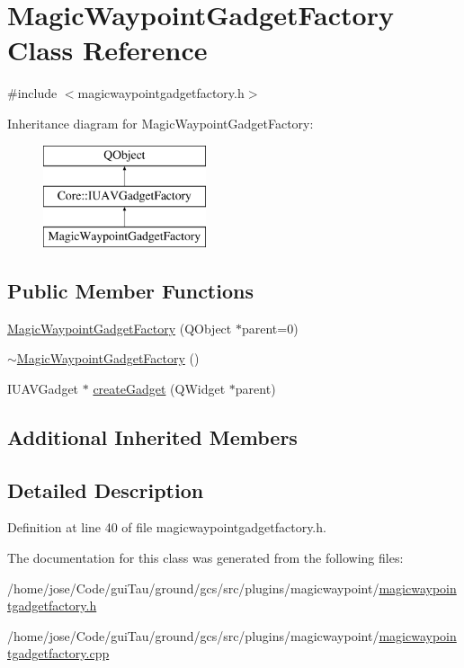 \hypertarget{class_magic_waypoint_gadget_factory}{\section{Magic\-Waypoint\-Gadget\-Factory Class Reference}
\label{class_magic_waypoint_gadget_factory}
}


{\ttfamily \#include $<$magicwaypointgadgetfactory.\-h$>$}

Inheritance diagram for Magic\-Waypoint\-Gadget\-Factory\-:\begin{figure}[H]
\begin{center}
\leavevmode
\includegraphics[height=3.000000cm]{class_magic_waypoint_gadget_factory}
\end{center}
\end{figure}
\subsection*{Public Member Functions}
\begin{DoxyCompactItemize}
\item 
\hyperlink{group___g_c_s_control_gadget_plugin_gae7ad3cb8d55b05f06354047f33941fc1}{Magic\-Waypoint\-Gadget\-Factory} (Q\-Object $\ast$parent=0)
\item 
\hyperlink{group___g_c_s_control_gadget_plugin_ga0b16d239f1aa3859ed11c4a572a9e5fd}{$\sim$\-Magic\-Waypoint\-Gadget\-Factory} ()
\item 
I\-U\-A\-V\-Gadget $\ast$ \hyperlink{group___g_c_s_control_gadget_plugin_gac8c3a2facf7fe1515b2d277b58ee9d0b}{create\-Gadget} (Q\-Widget $\ast$parent)
\end{DoxyCompactItemize}
\subsection*{Additional Inherited Members}


\subsection{Detailed Description}


Definition at line 40 of file magicwaypointgadgetfactory.\-h.



The documentation for this class was generated from the following files\-:\begin{DoxyCompactItemize}
\item 
/home/jose/\-Code/gui\-Tau/ground/gcs/src/plugins/magicwaypoint/\hyperlink{magicwaypointgadgetfactory_8h}{magicwaypointgadgetfactory.\-h}\item 
/home/jose/\-Code/gui\-Tau/ground/gcs/src/plugins/magicwaypoint/\hyperlink{magicwaypointgadgetfactory_8cpp}{magicwaypointgadgetfactory.\-cpp}\end{DoxyCompactItemize}
